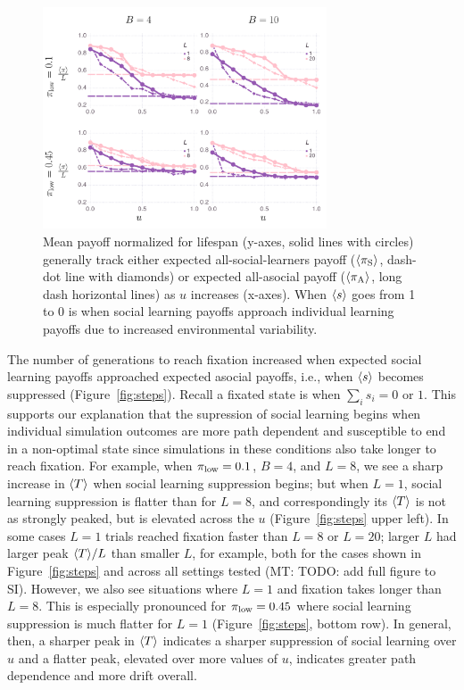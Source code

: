 \documentclass[letterpaper,11.5pt]{scrartcl}
\newcommand{\mt}[1]{{\textcolor{myorange} {({\tiny MT:} #1)}}}
\begin{document}
\begin{figure}
  \caption{Mean payoff normalized for lifespan (y-axes, solid lines with circles)
    generally track either expected all-social-learners payoff ($\langle \pi_\mathrm{S} \rangle$, dash-dot
    line with diamonds) or expected all-asocial payoff ($\langle \pi_\mathrm{A} \rangle$, long dash
    horizontal lines) as $u$ increases (x-axes). When $\langle s \rangle$ goes from 1 to
  0 is when social learning payoffs approach individual learning payoffs due to
increased environmental variability.} 
  \label{fig:payoffs}
\centering
    \includegraphics[width=0.75\textwidth]{Figures/meanNetPayoffs.pdf}
\end{figure}

The number of generations to reach fixation increased
when expected social learning payoffs approached expected asocial payoffs, i.e.,
when $\langle s \rangle$ becomes suppressed (Figure~\ref{fig:steps}). Recall a fixated
state is when $\sum_i s_i = 0 \text{ or } 1$.  This supports our explanation that
the supression of social learning begins when individual simulation outcomes are
more path dependent and susceptible to end in a non-optimal state since simulations
in these conditions also take longer to reach fixation.  For example, when
$\pi_{\mathrm{low}}=0.1$, $B=4$, and $L=8$, we see a sharp increase in $\langle T \rangle$ when social learning
suppression begins; but when $L=1$, social learning suppression is flatter
than for $L=8$, and  correspondingly its $\langle T \rangle$ is not as strongly peaked, but is
elevated across the $u$ (Figure~\ref{fig:steps} upper left).  In some cases $L=1$
trials reached fixation faster than $L=8$ or $L=20$; larger $L$ had larger peak $\langle T \rangle/L$
than smaller $L$, for example, both for the cases shown in Figure~\ref{fig:steps}
and across all settings tested \mt{TODO: add full figure to SI}. 
However, we also see situations where $L=1$ and fixation takes longer than $L=8$.
This is especially pronounced for
$\pi_{\mathrm{low}} = 0.45$ where social learning suppression is much flatter for $L=1$
(Figure~\ref{fig:steps}, bottom row). In general, then, a sharper peak in $\langle T \rangle$
indicates a sharper suppression of social learning over $u$ and a flatter peak,
elevated over more values of $u$, indicates greater path dependence and more 
drift overall.
\end{document}
